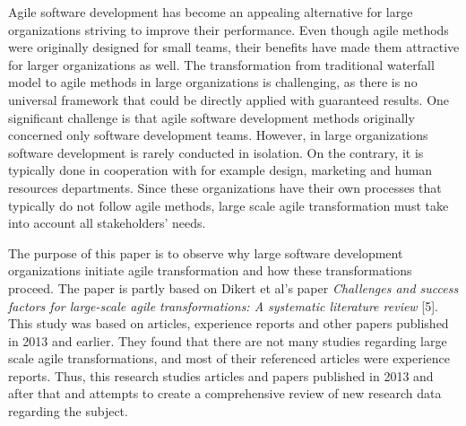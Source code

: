 Agile software development has become an appealing alternative for
large organizations striving to improve their performance. Even
though agile methods were originally designed for small teams, their
benefits have made them attractive for larger organizations as well.
The transformation from traditional waterfall model to agile methods
in large organizations is challenging, as there is no universal
framework that could be directly applied with guaranteed results.
One significant challenge is that agile software development methods
originally concerned only software development teams. However, in
large organizations software development is rarely conducted in
isolation. On the contrary, it is typically done in cooperation with for
example design, marketing and human resources departments. Since these
organizations have their own processes that typically do not follow
agile methods, large scale agile transformation must take into account
all stakeholders' needs.

The purpose of this paper is to observe why large software
development organizations initiate agile transformation and how these
transformations proceed. The paper is partly based on Dikert et al's
paper \textit{Challenges and success factors for large-scale agile
transformations: A systematic literature review} [5]. This study was
based on articles, experience reports and other papers published in 2013
and earlier. They found that there are not many studies regarding large
scale agile transformations, and most of their referenced articles were
experience reports. Thus, this research studies articles and papers
published in 2013 and after that and attempts to create a comprehensive
review of new research data regarding the subject.
